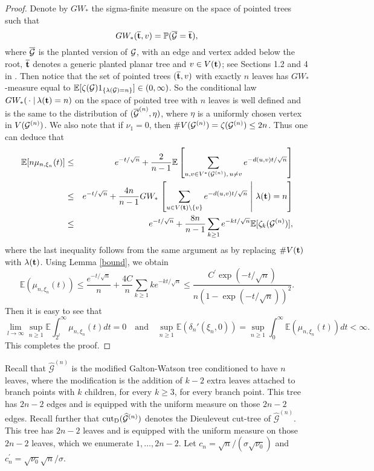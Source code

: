 \documentclass[11pt,a4paper]{article}
\newcommand{\bP}{\mathbb{P}}
\newcommand{\bE}{\mathbb{E}}
\newcommand{\cG}{\mathcal{G}}
\def\beqnn{\begin{eqnarray*}}\def\eeqnn{\end{eqnarray*}}
\begin{document}
\begin{proof}
Denote by $GW_*$ the sigma-finite measure on the space of pointed trees such that
$$
GW_*(\overline{{\bf t}}, v)={\bP}(\overline{\cal G}= \overline{{\bf t}}),
$$
where $\overline{\cal G}$ is the planted version of $\cal G$, with an edge and vertex added below the root, $\overline{{\bf t}}$ denotes a generic planted planar tree and $v\in V({\bf t})$; see Sections 1.2 and 4 in \cite{BM}. Then notice that the set of pointed trees $(\overline{\bf t}, v)$ with exactly $n$ leaves has $GW_{*}$-measure equal to ${\bE}[\zeta({\cal G})1_{\{\lambda({\cal G})=n\}}]\in(0,\infty)$. So the conditional law $GW_{*}(\,\cdot\;|\,\lambda({\bf t})=n)$ on the space of pointed tree with $n$ leaves is well defined and is the same to the distribution of $(\overline{{\cal G}}^{(n)}, \eta)$, where $\eta$ is a uniformly chosen vertex in $V({\cal G}^{(n)} )$. We also note that if $\nu_1=0$, then $ \#V({\cal G}^{(n)} )=\zeta( {\cal G}^{(n)})\leq 2n$. Thus one can deduce that
\beqnn
{\bE}[n\mu_{n, \xi_n}(t)]
&\leq & e^{-t/\sqrt{n}}+\frac{2}{n-1}{\bE}\left[ \sum_{u, v\in V^*({\cal G}^{(n)}),\,u\neq v}e^{-d(u, v)t/\sqrt{n}}\right]\cr
&\leq & e^{-t/\sqrt{n}}+\frac{4n}{n-1}GW_*\left.\left[ \sum_{u\in V({\bf t})\setminus\{v\}}e^{-d(u,v)t/\sqrt{n}}\;\right|\,\lambda({\bf t})=n\right]\cr
&\leq & e^{-t/\sqrt{n}}+\frac{8n}{n-1}\sum_{k\ge 1}e^{-kt/\sqrt{n}}\bE[ \zeta_k({\cal G}^{(n)})],
\eeqnn
where the last inequality follows from the same argument as \cite{BM} by replacing $\#V({\bf t})$ with $\lambda({\bf t})$. Using Lemma \ref{bound}, we obtain
$$
{\bE}(\mu_{n, \xi_n}(t))\leq \frac{e^{-t/\sqrt{n}} }{n}+\frac{4C}{n}\sum_{k\geq1}ke^{-kt/\sqrt{n}}\leq \frac{C^\prime \exp(-t/\sqrt{n})}{n(1-\exp(-t/\sqrt{n}))^2}.
$$
Then it is easy to see that
$$\lim_{l\rightarrow\infty}\sup_{n\geq1}{\mathbb E}\int_{2^l}^{\infty}\mu_{n, \xi_n}(t)dt=0\quad\mbox{and}\quad
\sup_{n\geq1}{\bE}(\delta_n'(\xi_n, 0))=\sup_{n\geq1}\int_0^{\infty} {\bE}(\mu_{n, \xi_n}(t))dt<\infty.
$$
This completes the proof.
\end{proof}


Recall that $\widehat{\cG}^{(n)}$ is the modified Galton-Watson tree conditioned to have $n$ leaves, where the modification is the addition of $k-2$ extra leaves
attached to branch points with $k$ children, for every $k\ge 3$, for every branch point. This tree has $2n-2$ edges and is equipped with the uniform measure on those $2n-2$
edges. Recall further that ${\rm cut}_{\rm D}(\widehat{\cG}^{(n)})$ denotes the Dieuleveut cut-tree of $\widehat{\cG}^{(n)}$. This tree has $2n-2$ leaves and is equipped with the uniform measure on those $2n-2$ leaves, which we enumerate $1,\ldots,2n-2$. Let $c_n=\sqrt{n}/(\sigma\sqrt{\nu_0})$ and
$c_n^\prime=\sqrt{\nu_0}\sqrt{n}/\sigma$.
\end{document}
